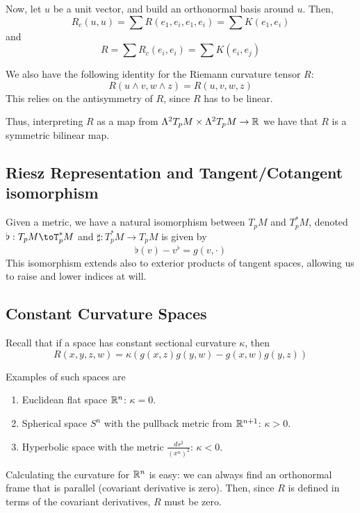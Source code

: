 \documentclass[../main.tex]{subfiles}
\begin{document}
Now, let $u$ be a unit vector, and build an orthonormal basis around $u$. Then,
\[
    R_c(u,u) = \sum R(e_1,e_i,e_1,e_i) = \sum K(e_1,e_i)
\]
and
\[
    R = \sum R_c(e_i,e_i) = \sum K(e_i,e_j)
\]


We also have the following identity for the Riemann curvature tensor $R$:
\begin{equation}
    R(u\wedge v, w\wedge z) = R(u,v,w,z)
\end{equation}
This relies on the antisymmetry of $R$, since $R$ has to be linear.

Thus, interpreting $R$ as a map from $\Lambda^2T_pM\times\Lambda^2T_pM\to\mathbb{R}$ we
have that $R$ is a symmetric bilinear map.

\subsection{Riesz Representation and Tangent/Cotangent isomorphism}
Given a metric, we have a natural isomorphism between $T_pM$ and $T^*_pM$,
denoted $\flat: T_pM\toT^*_pM$ and $\sharp:T^*_pM\to T_pM$ is given by
\begin{equation}
    \flat(v) - v^{\flat} = g(v,\cdot)
\end{equation}
This isomorphism extends also to exterior products of tangent spaces, allowing
us to raise and lower indices at will.

\subsection{Constant Curvature Spaces}
Recall that if a space has constant sectional curvature $\kappa$, then
\begin{equation}
    R(x,y,z,w) = \kappa(g(x,z)g(y,w) - g(x,w)g(y,z))
\end{equation}

Examples of such spaces are
\begin{enumerate}
    \item Euclidean flat space $\mathbb{R}^n$: $\kappa=0$.
    \item Spherical space $S^n$ with the pullback metric from $\mathbb{R}^{n+1}$: 
        $\kappa>0$.
    \item Hyperbolic space with the metric $\frac{ds^2}{(x^n)^2}$: $\kappa<0$.
\end{enumerate}

Calculating the curvature for $\mathbb{R}^n$ is easy: we can always find an orthonormal
frame that is parallel (covariant derivative is zero). Then, since $R$ is
defined in terms of the covariant derivatives, $R$ must be zero.
\end{document}
